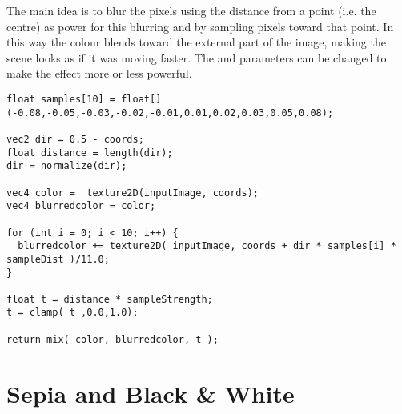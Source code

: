   The main idea is to blur the pixels using the distance from a point (i.e. the centre) as power for this blurring and by sampling pixels
  toward that point. In this way the colour blends toward the external part of the image, making the scene looks as if it
  was moving faster. The  and  parameters can be changed to make the effect
  more or less powerful.
  
  \begin{lstlisting}
float samples[10] = float[](-0.08,-0.05,-0.03,-0.02,-0.01,0.01,0.02,0.03,0.05,0.08);

vec2 dir = 0.5 - coords;
float distance = length(dir);
dir = normalize(dir);

vec4 color =  texture2D(inputImage, coords);
vec4 blurredcolor = color;

for (int i = 0; i < 10; i++) {
  blurredcolor += texture2D( inputImage, coords + dir * samples[i] * sampleDist )/11.0;
}

float t = distance * sampleStrength;
t = clamp( t ,0.0,1.0);

return mix( color, blurredcolor, t );
  \end{lstlisting}


\section{Sepia and Black \& White}

